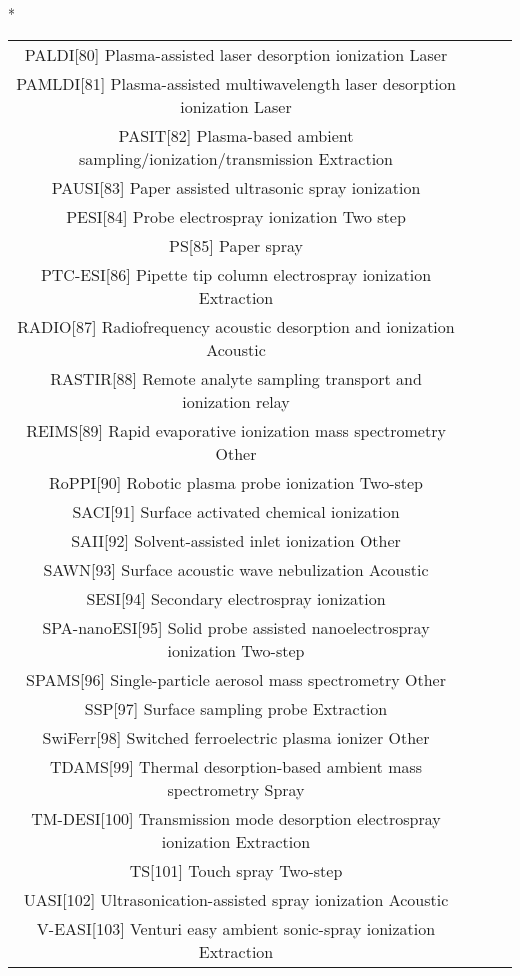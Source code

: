 \begin{table}{*}
\begin{tabular}{|c|c|c|l|}
PALDI[80] Plasma-assisted laser desorption ionization Laser \\
PAMLDI[81] Plasma-assisted multiwavelength laser desorption ionization Laser \\
PASIT[82] Plasma-based ambient sampling/ionization/transmission Extraction \\
PAUSI[83] Paper assisted ultrasonic spray ionization  \\
PESI[84] Probe electrospray ionization Two step \\
PS[85] Paper spray  \\
PTC-ESI[86] Pipette tip column electrospray ionization Extraction \\
RADIO[87] Radiofrequency acoustic desorption and ionization Acoustic \\
RASTIR[88] Remote analyte sampling transport and ionization relay \\ 
REIMS[89] Rapid evaporative ionization mass spectrometry Other \\
RoPPI[90] Robotic plasma probe ionization Two-step \\
SACI[91] Surface activated chemical ionization  \\
SAII[92] Solvent-assisted inlet ionization Other \\
SAWN[93] Surface acoustic wave nebulization Acoustic \\
SESI[94] Secondary electrospray ionization  \\
SPA-nanoESI[95] Solid probe assisted nanoelectrospray ionization Two-step \\
SPAMS[96] Single-particle aerosol mass spectrometry Other \\
SSP[97] Surface sampling probe Extraction \\
SwiFerr[98] Switched ferroelectric plasma ionizer Other \\
    TDAMS[99] Thermal desorption-based ambient mass spectrometry Spray \\
    TM-DESI[100] Transmission mode desorption electrospray ionization Extraction \\
    TS[101] Touch spray Two-step \\
    UASI[102] Ultrasonication-assisted spray ionization Acoustic \\
    V-EASI[103] Venturi easy ambient sonic-spray ionization Extraction \\
    \hline \hline 
    \end{tabular} 
\end{table}